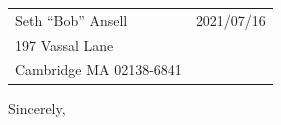\documentclass[11pt]{article}%
\def\docdate{2021/07/16}%
\begin{document}
\begin{tabular*}{\columnwidth}{@{\extracolsep{\fill}}lr}%
  Seth ``Bob'' Ansell & \docdate \\
  197 Vassal Lane \\
  Cambridge MA 02138-6841
\end{tabular*}

\begin{multicols}{2}
\lipsum[1-6]
\end{multicols}

\begin{paracol}{2}\switchcolumn
Sincerely,

 \docfrom \\
 \doctitle\vspace{3ex}

\hbox{
%
\vtop{\hsize=0.9\linewidth \lipsum[7]}%
}
\end{paracol}
\end{document}

